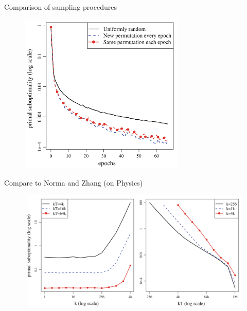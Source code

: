 \begin{frame}{Comparison of sampling procedures}
    \begin{figure}[htbp]
        \centering
        \includegraphics[height=0.7\textheight, width=0.7\textwidth]{images/epochs.png}
    \end{figure}
\end{frame}

\begin{frame}{Compare to Norma and Zhang (on Physics)}
    \begin{figure}[htbp]
        \centering
        \includegraphics[height=0.7\textheight, width=\textwidth]{images/comp_nzh.png}
    \end{figure}
\end{frame}

